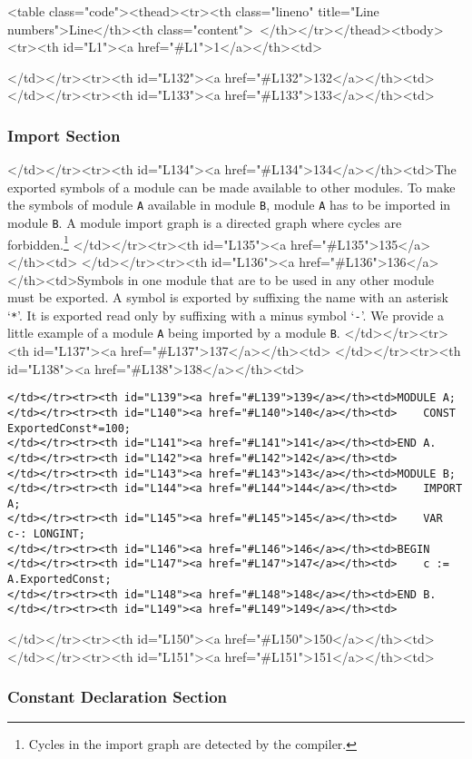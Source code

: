 <table class="code"><thead><tr><th class="lineno" title="Line numbers">Line</th><th class="content"> </th></tr></thead><tbody><tr><th id="L1"><a href="#L1">1</a></th><td>\documentclass[a4paper,11pt]{article}
\begin{document}
</td></tr><tr><th id="L132"><a href="#L132">132</a></th><td>
</td></tr><tr><th id="L133"><a href="#L133">133</a></th><td>\subsubsection{Import Section} \label{section:ImportList}
</td></tr><tr><th id="L134"><a href="#L134">134</a></th><td>The exported symbols of a module can be made available to other modules. To make the symbols of module \verb+A+ available in module \verb+B+, module \verb+A+ has to be imported in module \verb+B+. A module import graph is a directed graph where cycles are forbidden.\footnote{Cycles in the import graph are detected by the compiler.}
</td></tr><tr><th id="L135"><a href="#L135">135</a></th><td>
</td></tr><tr><th id="L136"><a href="#L136">136</a></th><td>Symbols in one module that are to be used in any other module must be exported. A symbol is exported by suffixing the name with an asterisk `\verb+*+'. It is exported read only by suffixing with a minus symbol `\verb+-+'. We provide a little example of a module \verb+A+ being imported by a module \verb+B+.
</td></tr><tr><th id="L137"><a href="#L137">137</a></th><td>
</td></tr><tr><th id="L138"><a href="#L138">138</a></th><td>\begin{lstlisting}[language=Oberon,frame=none,caption={B imports A}]
</td></tr><tr><th id="L139"><a href="#L139">139</a></th><td>MODULE A;
</td></tr><tr><th id="L140"><a href="#L140">140</a></th><td>    CONST ExportedConst*=100;
</td></tr><tr><th id="L141"><a href="#L141">141</a></th><td>END A.
</td></tr><tr><th id="L142"><a href="#L142">142</a></th><td>
</td></tr><tr><th id="L143"><a href="#L143">143</a></th><td>MODULE B;
</td></tr><tr><th id="L144"><a href="#L144">144</a></th><td>    IMPORT A;
</td></tr><tr><th id="L145"><a href="#L145">145</a></th><td>    VAR c-: LONGINT;
</td></tr><tr><th id="L146"><a href="#L146">146</a></th><td>BEGIN
</td></tr><tr><th id="L147"><a href="#L147">147</a></th><td>    c := A.ExportedConst;
</td></tr><tr><th id="L148"><a href="#L148">148</a></th><td>END B.
</td></tr><tr><th id="L149"><a href="#L149">149</a></th><td>\end{lstlisting}
</td></tr><tr><th id="L150"><a href="#L150">150</a></th><td>
</td></tr><tr><th id="L151"><a href="#L151">151</a></th><td>\subsubsection{Constant Declaration Section}\label{section:ConstantDeclarationSection}
\end{document}
